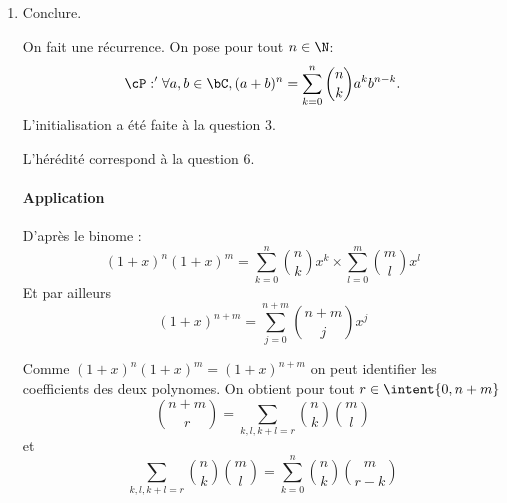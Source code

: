 \begin{correction}
\begin{enumerate}
\item Conclure. 



On fait une récurrence. On pose pour tout $n\in \N$:
$$\cP :' \forall a, b\in \bC, (a+b)^n =\sum_{k=0}^n \binom{n}{k}a^k b^{n-k}.$$
L'initialisation a été faite à la question 3.

L'hérédité correspond à la question 6. 

\paragraph{Application }

D'après le binome :
$$(1+x)^n(1+x)^m = \sum_{k=0}^n \binom{n}{k}x^k \times  \sum_{l=0}^m \binom{m}{l}x^l $$
Et par ailleurs 
$$(1+x)^{n+m} =  \sum_{j=0}^{n+m} \binom{n+m}{j}x^j$$

Comme $(1+x)^n(1+x)^m =(1+x)^{n+m}$ on peut identifier les  coefficients des deux polynomes. On obtient pour tout $r\in \intent{0,n+m}$
$$ \binom{n+m}{r} = \sum_{k,l, k+l=r}  \binom{n}{k} \binom{m}{l}$$
et 
$$ \sum_{k,l, k+l=r}  \binom{n}{k} \binom{m}{l} = \sum_{k=0}^n  \binom{n}{k} \binom{m}{r-k}$$




\end{enumerate}










\end{correction}